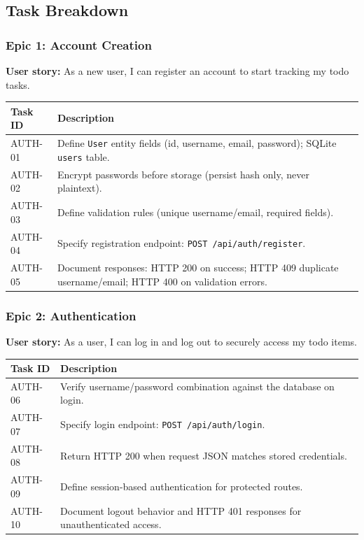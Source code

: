\subsection{Task Breakdown}\label{sec:tasks}

\subsubsection{Epic 1: Account Creation}
\textbf{User story:} As a new user, I can register an account to start tracking my todo tasks.

\begin{tabularx}{\textwidth}{@{} p{2.4cm} X @{}}
\toprule
\textbf{Task ID} & \textbf{Description} \\
\midrule 
AUTH-01 & Define \texttt{User} entity fields (id, username, email, password); SQLite \texttt{users} table. \\
AUTH-02 & Encrypt passwords before storage (persist hash only, never plaintext). \\
AUTH-03 & Define validation rules (unique username/email, required fields). \\
AUTH-04 & Specify registration endpoint: \texttt{POST /api/auth/register}. \\
AUTH-05 & Document responses: HTTP 200 on success; HTTP 409 duplicate username/email; HTTP 400 on validation errors. \\
\bottomrule
\end{tabularx}

\subsubsection{Epic 2: Authentication}
\textbf{User story:} As a user, I can log in and log out to securely access my todo items.

\begin{tabularx}{\textwidth}{@{} p{2.4cm} X @{}}
\toprule
\textbf{Task ID} & \textbf{Description} \\
\midrule
AUTH-06 & Verify username/password combination against the database on login. \\
AUTH-07 & Specify login endpoint: \texttt{POST /api/auth/login}. \\
AUTH-08 & Return HTTP 200 when request JSON matches stored credentials. \\
AUTH-09 & Define session-based authentication for protected routes. \\
AUTH-10 & Document logout behavior and HTTP 401 responses for unauthenticated access. \\
\bottomrule
\end{tabularx}

